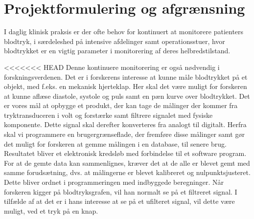 \chapter{Projektformulering og afgrænsning}
I daglig klinisk praksis er der ofte behov for kontinuert at monitorere patienters blodtryk, i særdeleshed på intensive afdelinger samt operationsstuer, hvor blodtrykket er en vigtig parameter i monitorering af deres helbredstilstand.

<<<<<<< HEAD
Denne kontinuere monitorering er også nødvendig i forskningsverdenen. Det er i forskerens interesse at kunne måle blodtrykket på et objekt, med f.eks. en mekanisk hjerteklap. Her skal det være muligt for forskeren at kunne aflæse diastole, systole og puls samt en pæn kurve over blodtrykket. Det er vores mål at opbygge et produkt, der kan tage de målinger der kommer fra tryktransduceren i volt og forstærke samt filtrere signalet med fysiske komponente. Dette signal skal derefter konverteres fra analogt til digitalt. Herfra skal vi programmere en brugergrænseflade, der fremføre disse målinger samt gør det muligt for forskeren at gemme målingen i en database, til senere brug. Resultatet bliver et elektronisk kredsløb med forbindelse til et software program.
For at de gemte data kan sammenlignes, kræver det at de alle er blevet gemt med samme forudsætning, dvs. at målingerne er blevet kalibreret og nulpunktsjusteret. Dette bliver ordnet i programmeringen med indbyggede beregninger. Når forskeren kigger på blodtryksgrafen, vil han normalt se på et filtreret signal. I tilfælde af at det er i hans interesse at se på et ufilteret signal, vil dette være muligt, ved et tryk på en knap.

